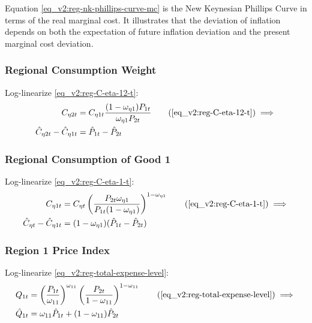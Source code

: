 \documentclass[../thesis.tex]{subfiles}
\begin{document}
Equation \ref{eq_v2:reg-nk-phillips-curve-mc} is the New Keynesian Phillips Curve in terms of the real marginal cost. It illustrates that the deviation of inflation depends on both the expectation of future inflation deviation and the present marginal cost deviation.


\subsubsection*{Regional Consumption Weight}

Log-linearize \ref{eq_v2:reg-C-eta-12-t}:
\begin{align}
	C_{\eta 2 t} &= C_{\eta 1 t} \frac{(1 - \omega_{\eta 1}) P_{1t}}{\omega_{\eta 1} P_{2t}} \tag{\ref{eq_v2:reg-C-eta-12-t}} \implies \\
	\hat{C}_{\eta 2t} - \hat{C}_{\eta 1t} &= \hat{P}_{1t} - \hat{P}_{2t} \label{eq_v2:reg-C-eta-12-t-ll}
\end{align}

\subsubsection*{Regional Consumption of Good 1}

Log-linearize \ref{eq_v2:reg-C-eta-1-t}:
\begin{align}
	C_{\eta 1 t} &= C_{\eta t} \left( \frac{P_{2t} \omega_{\eta 1}}{P_{1t} (1 - \omega_{\eta 1})} \right)^{1-\omega_{\eta 1}} \tag{\ref{eq_v2:reg-C-eta-1-t}} \implies \\
	\hat{C}_{\eta t} - \hat{C}_{\eta 1 t} &= (1 - \omega_{\eta 1}) (\hat{P}_{1t} - \hat{P}_{2t}) \label{eq_v2:reg-C-eta-1-t-ll}
\end{align}

\subsubsection*{Region 1 Price Index}

Log-linearize \ref{eq_v2:reg-total-expense-level}:
\begin{align}
	Q_{1t} &= \left( \frac{P_{1 t}}{\omega_{11}} \right)^{\omega_{11}} \left( \frac{P_{2 t}}{1 -\omega_{11}} \right)^{1 -\omega_{11}} \tag{\ref{eq_v2:reg-total-expense-level}} \implies \\
	\hat{Q}_{1t} &= \omega_{11} \hat{P}_{1 t} + (1 -\omega_{11}) \hat{P}_{2 t} \label{eq_v2:reg-total-expense-level-ll}
\end{align}
\end{document}

